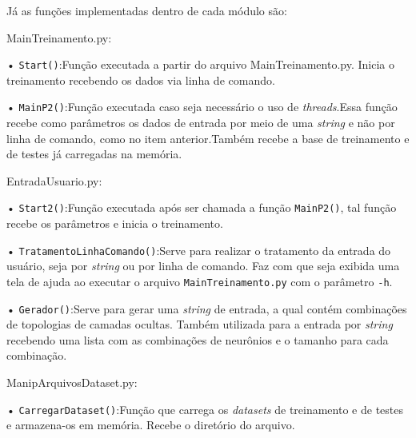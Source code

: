 \documentclass[12pt,oneside,a4paper,chapter=TITLE,section=TITLE,sumario
		=tradicional]{abntex2}
\begin{document}
		Já as funções implementadas dentro de cada módulo são:
		
		\begin{lista}
			\item MainTreinamento.py:
			\begin{lista}
				\item[•] \texttt{Start()}:\hspace{0.1cm}Função executada a partir do arquivo MainTreinamento.py. Inicia o treinamento recebendo os dados via linha de comando.
				
				\item[•] \texttt{MainP2()}:\hspace{0.1cm}Função executada caso seja necessário o uso de \textit{threads}.\hspace{0.1cm}Essa função recebe como parâmetros os dados de entrada por meio de uma \textit{string} e não por linha de comando, como no item anterior.\hspace{0.1cm}Também recebe a base de treinamento e de testes já carregadas na memória.
			\end{lista}
		
			\item EntradaUsuario.py:
			\begin{lista}
				\item[•] \texttt{Start2()}:\hspace{0.1cm}Função executada após ser chamada a função \texttt{MainP2()}, tal função recebe os parâmetros e inicia o treinamento.
				
				\item[•] \texttt{TratamentoLinhaComando()}:\hspace{0.1cm}Serve para realizar o tratamento da entrada do usuário, seja por \textit{string} ou por linha de comando. Faz com que seja exibida uma tela de ajuda ao executar o arquivo \texttt{MainTreinamento.py} com o parâmetro \texttt{-h}.
				
				\item[•] \texttt{Gerador()}:\hspace{0.1cm}Serve para gerar uma \textit{string} de entrada, a qual contém combinações de topologias de camadas ocultas. Também utilizada para a entrada por \textit{string} recebendo uma lista com as combinações de neurônios e o tamanho para cada combinação.
			\end{lista}
		
			\item ManipArquivosDataset.py:
			\begin{lista}
				\item[•] \texttt{CarregarDataset()}:\hspace{0.1cm}Função que carrega os \textit{datasets} de treinamento e de testes e armazena-os em memória. Recebe o diretório do arquivo.
				

\end{lista}
\end{lista}
\end{document}

